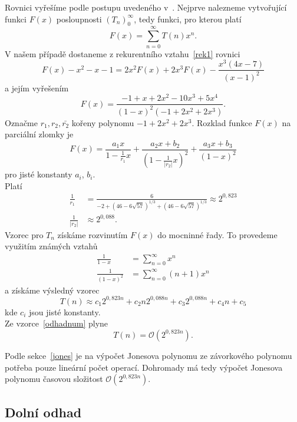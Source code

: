 \begin{dukaz}
Rovnici vyřešíme podle postupu uvedeného v~\cite{kapitoly}. Nejprve nalezneme vytvořující funkci $F(x)$ posloupnosti $\displaystyle (T_n)_0^\infty$, tedy funkci, pro kterou platí
$$ F(x) = \sum_{n=0}^{\infty} T(n)x^n.$$
V našem případě dostaneme z rekurentního vztahu~\ref{rek1} rovnici
\begin{equation*}
F(x) - x^2 -x -1 = 2 x^2 F(x) + 2 x^3 F(x) - \frac{x^3(4x-7)}{(x-1)^2}
\end{equation*}
a jejím vyřešením
\begin{equation*}
F(x) = \frac{-1+x+2x^2-10x^3+5x^4}{{(1-x)}^2(-1+2x^2+2 x^3)}.
\end{equation*}
Označme $r_1, r_2, \bar{r_2}$ kořeny polynomu $-1+2x^2+2 x^3$. Rozklad funkce $F(x)$ na parciální zlomky je
\begin{equation*}
F(x) = \frac{a_1 x}{1 - \frac{1}{r_1} x} + \frac{a_2 x + b_2}{\left(1-\frac{1}{ |r_2|} x \right) ^2} + \frac{a_3 x + b_3}{\left( 1-x \right) ^2}
\end{equation*}
pro jisté konstanty $a_i$, $b_i$.\\
Platí
\begin{align*}
\frac{1}{r_1} &= \frac{6}{-2+\left( {46-6\sqrt{57}} \right)^{1/3} + \left( {46-6\sqrt{57}}\right)^{1/3}} \approx 2^{0,823} \\
\frac{1}{ |r_2|} & \approx 2^{0,088  }.
\end{align*}
Vzorec pro $T_n$ získáme rozvinutím $F(x)$ do mocninné řady. To provedeme využitím známých vztahů
\begin{align*}
\frac{1}{1-x} &= \sum_{n=0}^{\infty} x^n \\
\frac{1}{ (1-x)^2}  &= \sum_{n=0}^{\infty}(n+1) x^n
\end{align*}
a získáme výsledný vzorec
\begin{equation} \label{odhadnum}
T(n) \approx c_1 2^{0,823 n } + c_2 n 2^{0,088 n } + c_3 2^{0,088 n } + c_4 n + c_5 
\end{equation} 
kde $c_i$ jsou jisté konstanty. \\

Ze vzorce~\ref{odhadnum} plyne $$ T(n)= \mathcal{O}\left( 2^{0,823 n }\right).$$

Podle sekce~\ref{jones} je na výpočet Jonesova polynomu ze závorkového polynomu potřeba pouze lineární počet operací. Dohromady má tedy výpočet Jonesova polynomu časovou složitost $\mathcal{O}\left( 2^{0,823 n }\right)$.
\end{dukaz}

\subsection{Dolní odhad}

